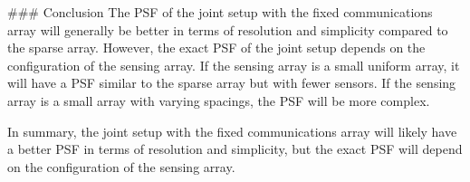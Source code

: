 ### Conclusion
The PSF of the joint setup with the fixed communications array will generally be better in terms of resolution and simplicity compared to the sparse array. However, the exact PSF of the joint setup depends on the configuration of the sensing array. If the sensing array is a small uniform array, it will have a PSF similar to the sparse array but with fewer sensors. If the sensing array is a small array with varying spacings, the PSF will be more complex.

In summary, the joint setup with the fixed communications array will likely have a better PSF in terms of resolution and simplicity, but the exact PSF will depend on the configuration of the sensing array.